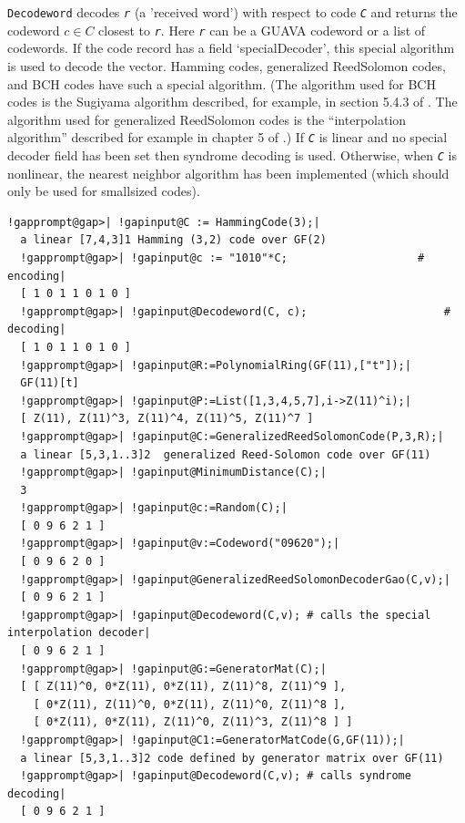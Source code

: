 \documentclass[a4paper,11pt]{report}
\begin{document}
{{{ \texttt{Decodeword} decodes \mbox{\texttt{\mdseries\slshape r}} (a 'received word') with respect to code \mbox{\texttt{\mdseries\slshape C}} and returns the codeword $c \in C$ closest to \mbox{\texttt{\mdseries\slshape r}}. Here \mbox{\texttt{\mdseries\slshape r}} can be a \textsf{GUAVA} codeword or a list of codewords. If the code record has a field
`specialDecoder', this special algorithm is used to decode the vector. Hamming
codes, generalized Reed\texttt{}Solomon codes, and BCH codes have
such a special algorithm. (The algorithm used for BCH codes is the Sugiyama
algorithm described, for example, in section 5.4.3 of \cite{HP03}. The algorithm used for generalized Reed\texttt{}Solomon codes is
the ``interpolation algorithm'' described for example in chapter 5 of \cite{JH04}.) If \mbox{\texttt{\mdseries\slshape C}} is linear and no special decoder field has been set then syndrome decoding is
used. Otherwise, when \mbox{\texttt{\mdseries\slshape C}} is non\texttt{}linear, the nearest neighbor algorithm has been
implemented (which should only be used for small\texttt{}sized
codes). }

 
\begin{Verbatim}[commandchars=!@|,fontsize=\small,frame=single,label=Example]
  !gapprompt@gap>| !gapinput@C := HammingCode(3);|
  a linear [7,4,3]1 Hamming (3,2) code over GF(2)
  !gapprompt@gap>| !gapinput@c := "1010"*C;                    # encoding|
  [ 1 0 1 1 0 1 0 ]
  !gapprompt@gap>| !gapinput@Decodeword(C, c);                     # decoding|
  [ 1 0 1 1 0 1 0 ]
  !gapprompt@gap>| !gapinput@R:=PolynomialRing(GF(11),["t"]);|
  GF(11)[t]
  !gapprompt@gap>| !gapinput@P:=List([1,3,4,5,7],i->Z(11)^i);|
  [ Z(11), Z(11)^3, Z(11)^4, Z(11)^5, Z(11)^7 ]
  !gapprompt@gap>| !gapinput@C:=GeneralizedReedSolomonCode(P,3,R);|
  a linear [5,3,1..3]2  generalized Reed-Solomon code over GF(11)
  !gapprompt@gap>| !gapinput@MinimumDistance(C);|
  3
  !gapprompt@gap>| !gapinput@c:=Random(C);|
  [ 0 9 6 2 1 ]
  !gapprompt@gap>| !gapinput@v:=Codeword("09620");|
  [ 0 9 6 2 0 ]
  !gapprompt@gap>| !gapinput@GeneralizedReedSolomonDecoderGao(C,v);|
  [ 0 9 6 2 1 ]
  !gapprompt@gap>| !gapinput@Decodeword(C,v); # calls the special interpolation decoder|
  [ 0 9 6 2 1 ]
  !gapprompt@gap>| !gapinput@G:=GeneratorMat(C);|
  [ [ Z(11)^0, 0*Z(11), 0*Z(11), Z(11)^8, Z(11)^9 ], 
    [ 0*Z(11), Z(11)^0, 0*Z(11), Z(11)^0, Z(11)^8 ], 
    [ 0*Z(11), 0*Z(11), Z(11)^0, Z(11)^3, Z(11)^8 ] ]
  !gapprompt@gap>| !gapinput@C1:=GeneratorMatCode(G,GF(11));|
  a linear [5,3,1..3]2 code defined by generator matrix over GF(11)
  !gapprompt@gap>| !gapinput@Decodeword(C,v); # calls syndrome decoding|
  [ 0 9 6 2 1 ]
\end{Verbatim}
  

}}
\end{document}
